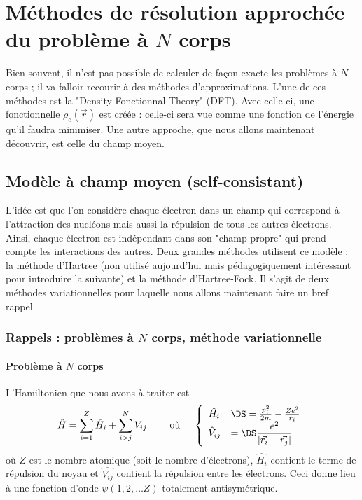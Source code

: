 \chapter{Méthodes de résolution approchée du problème à $N$ corps}
Bien souvent, il n'est pas possible de calculer de façon exacte les problèmes à $N$ corps ; il va 
falloir recourir à des méthodes d’approximations. L'une de ces méthodes est la "Density Fonctionnal 
Theory" (DFT). Avec celle-ci, une fonctionnelle $\rho_e(\vec{r})$ est créée : celle-ci sera vue comme 
une fonction de l'énergie qu'il faudra minimiser. Une autre approche, que nous allons maintenant 
découvrir, est celle du champ moyen.

\section{Modèle à champ moyen (self-consistant)}

L'idée est que l'on considère chaque électron dans un champ qui correspond à l'attraction des nucléons mais 
aussi la répulsion de tous les autres électrons. Ainsi, chaque électron est indépendant dans son "champ propre" 
qui prend compte les interactions des autres. Deux grandes méthodes utilisent ce modèle : la méthode d'Hartree (non utilisé aujourd'hui mais pédagogiquement intéressant pour introduire la suivante) et la méthode d'Hartree-Fock. 
Il s'agit de deux méthodes variationnelles pour laquelle nous allons maintenant faire un bref rappel.

\subsection{Rappels : problèmes à $N$ corps, méthode variationnelle}
\subsubsection{Problème à $N$ corps}
L'Hamiltonien que nous avons à traiter est
\begin{equation}
\hat{H} = \sum_{i=1}^Z \hat{H_i} + \sum_{i>j}^N V_{ij}\qquad\text{ où }\quad \left\{\begin{array}{ll}
\hat{H_i} &\DS= \frac{p_i^2}{2m}-\frac{Ze^2}{r_i}\\
\hat{V}_{ij} &=\DS \dfrac{e^2}{|\vec{r_i}-\vec{r_j}|}
\end{array}\right.
\end{equation}où $Z$ est le nombre atomique (soit le nombre d'électrons), $\hat{H_i}$ contient le terme de 
répulsion du noyau et $\hat{V_{ij}}$ contient la répulsion entre les électrons. Ceci donne lieu à une 
fonction d'onde $\psi(1,2,\dots Z)$ totalement antisymétrique. \\

